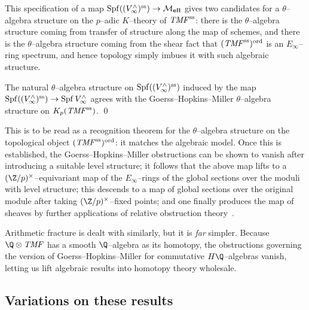\noindent This specification of a map \(\operatorname{Spf} ((V^\wedge_\infty)^{\mathrm{ss}}) \to \mathcal{M}_{\mathbf{ell}}\) gives two candidates for a \(\theta\)--algebra structure on the \(p\)--adic \(K\)--theory of \(\mathit{TMF}^{\mathrm{ss}}\): there is the \(\theta\)--algebra structure coming from transfer of structure along the map of schemes, and there is the \(\theta\)--algebra structure coming from the shear fact that \((\mathit{TMF}^{\mathrm{ss}})^{\mathrm{ord}}\) is an \(E_\infty\)--ring spectrum, and hence topology simply imbues it with such algebraic structure.

\begin{theorem}
The natural \(\theta\)--algebra structure on \(\operatorname{Spf} ((V^\wedge_\infty)^{\mathrm{ss}})\) induced by the map \(\operatorname{Spf} ((V^\wedge_\infty)^{\mathrm{ss}}) \to \operatorname{Spf} V^\wedge_\infty\) agrees with the Goerss--Hopkins--Miller \(\theta\)--algebra structure on \(K_p (\mathit{TMF}^{\mathrm{ss}})\). \qed
\end{theorem}

\noindent This is to be read as a recognition theorem for the \(\theta\)--algebra structure on the topological object \((\mathit{TMF}^{\mathrm{ss}})^{\mathrm{ord}}\): it matches the algebraic model.  Once this is established, the Goerss--Hopkins--Miller obstructions can be shown to vanish after introducing a suitable level structure; it follows that the above map lifts to a \((\Z/p)^{\times}\)--equivariant map of the \(E_\infty\)--rings of the global sections over the moduli with level structure; this descends to a map of global sections over the original module after taking \((\Z/p)^\times\)--fixed points; and one finally produces the map of sheaves by further applications of relative obstruction theory~\cite[Section 8, Step 2]{BehrensConstruction}.

\begin{remark}
Arithmetic fracture is dealt with similarly, but it is \emph{far} simpler.  Because \(\Q \otimes \TMF\) has a smooth \(\Q\)--algebra as its homotopy, the obstructions governing the version of Goerss--Hopkins--Miller for commutative \(H\Q\)--algebras vanish, letting us lift algebraic results into homotopy theory wholesale.
\end{remark}






\subsection*{Variations on these results}

